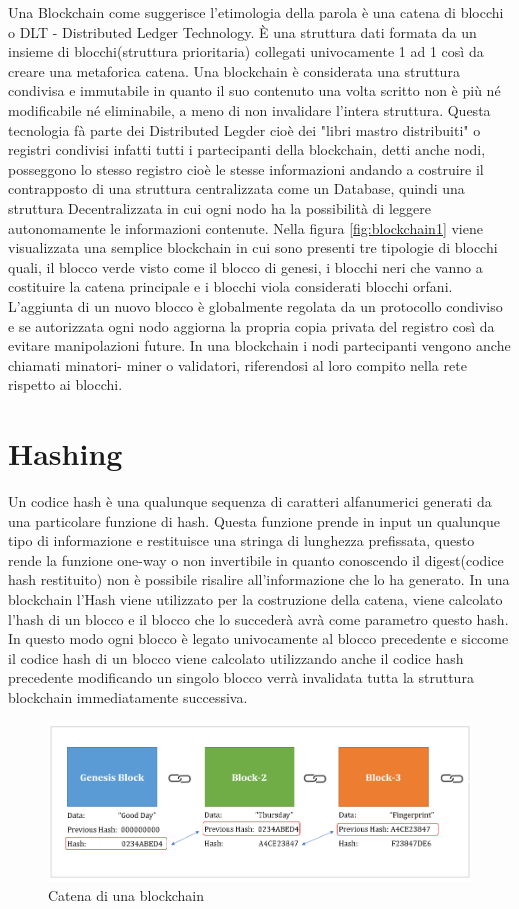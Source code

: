 \documentclass[12pt,titlepage]{report}
\begin{document}
Una Blockchain come suggerisce l'etimologia della parola è una catena di blocchi o DLT - Distributed Ledger Technology. È una struttura dati formata da un insieme di blocchi(struttura prioritaria) collegati univocamente 1 ad 1 così da creare una metaforica catena. Una blockchain è considerata una struttura condivisa e immutabile in quanto il suo contenuto una volta scritto non è più né modificabile né eliminabile, a meno di non invalidare l'intera struttura. Questa tecnologia fà parte dei Distributed Legder cioè dei "libri mastro distribuiti" o registri condivisi infatti tutti i partecipanti della blockchain, detti anche nodi, posseggono lo stesso registro cioè le stesse informazioni andando a costruire il contrapposto di una struttura centralizzata come un Database, quindi una struttura Decentralizzata in cui ogni nodo ha la possibilità di leggere autonomamente le informazioni contenute.
Nella figura \ref{fig:blockchain1} viene visualizzata una semplice blockchain in cui sono presenti tre tipologie di blocchi quali, il blocco verde visto come il blocco di genesi, i blocchi neri che vanno a costituire la catena principale e i blocchi viola considerati blocchi orfani. L'aggiunta di un nuovo blocco è globalmente regolata da un protocollo condiviso e se autorizzata ogni nodo aggiorna la propria copia privata del registro così da evitare manipolazioni future. In una blockchain i nodi partecipanti vengono anche chiamati minatori- miner o validatori, riferendosi al loro compito nella rete rispetto ai blocchi.

\section{Hashing}
Un codice hash è una qualunque sequenza di caratteri alfanumerici generati da una particolare funzione di hash. Questa funzione prende in input un qualunque tipo di informazione e restituisce una stringa di lunghezza prefissata, questo rende la funzione one-way o non invertibile in quanto conoscendo il digest(codice hash restituito) non è possibile risalire all'informazione che lo ha generato. In una blockchain l'Hash viene utilizzato per la costruzione della catena, viene calcolato l'hash di un blocco e il blocco che lo succederà avrà come parametro questo hash. In questo modo ogni blocco è legato univocamente al blocco precedente e siccome il codice hash di un blocco viene calcolato utilizzando anche il codice hash precedente modificando un singolo blocco verrà invalidata tutta la struttura blockchain immediatamente successiva.
\begin{figure}[h]
	\includegraphics[width=\textwidth]{bc1}
	\centering
	\caption{Catena di una blockchain}
	\label{fig:blockchain2}
\end{figure}
\end{document}

